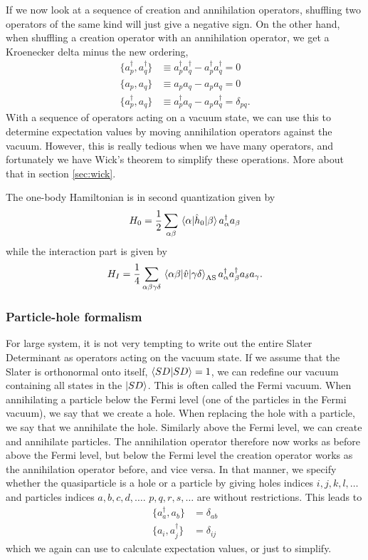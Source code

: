 If we now look at a sequence of creation and annihilation operators, shuffling two operators of the same kind will just give a negative sign. On the other hand, when shuffling a creation operator with an annihilation operator, we get a Kroenecker delta minus the new ordering,
\begin{align}
	\{a_p^{\dagger},a_q^{\dagger}\}&\equiv a_p^{\dagger}a_q^{\dagger}-a_p^{\dagger}a_q^{\dagger}=0\\
	\{a_p,a_q\}&\equiv a_pa_q-a_pa_q=0\\
	\{a_p^{\dagger},a_q\}&\equiv a_p^{\dagger}a_q-a_pa_q^{\dagger}=\delta_{pq}.
\end{align}
With a sequence of operators acting on a vacuum state, we can use this to determine expectation values by moving annihilation operators against the vacuum. However, this is really tedious when we have many operators, and fortunately we have Wick's theorem to simplify these operations. More about that in section \eqref{sec:wick}.

The one-body Hamiltonian is in second quantization given by
\begin{equation}
	H_0=\frac{1}{2}\sum_{\alpha\beta}\mel{\alpha}{\hat{h}_0}{\beta}a_{\alpha}^{\dagger}a_{\beta}
\end{equation}
while the interaction part is given by
\begin{equation}
	H_I=\frac{1}{4}\sum_{\alpha\beta\gamma\delta}\mel{\alpha\beta}{\hat{v}}{\gamma\delta}_{\text{AS}}a_{\alpha}^{\dagger}a_{\beta}^{\dagger}a_{\delta}a_{\gamma}.
\end{equation}

\subsubsection{Particle-hole formalism}
For large system, it is not very tempting to write out the entire Slater Determinant as operators acting on the vacuum state. If we assume that the Slater is orthonormal onto itself, $\braket{SD}{SD}=1$, we can redefine our vacuum containing all states in the $\ket{SD}$. This is often called the Fermi vacuum. When annihilating a particle below the Fermi level (one of the particles in the Fermi vacuum), we say that we create a hole. When replacing the hole with a particle, we say that we annihilate the hole. Similarly above the Fermi level, we can create and annihilate particles. The annihilation operator therefore now works as before above the Fermi level, but below the Fermi level the creation operator works as the annihilation operator before, and vice versa. In that manner, we specify whether the quasiparticle is a hole or a particle by giving holes indices $i,j,k,l,\hdots$ and particles indices $a,b,c,d,\hdots$. $p,q,r,s,\hdots$ are without restrictions. This leads to
\begin{align}
	\{a_a^{\dagger},a_b\}&=\delta_{ab}\\
	\{a_i,a_j^{\dagger}\}&=\delta_{ij}
\end{align}
which we again can use to calculate expectation values, or just to simplify. 

